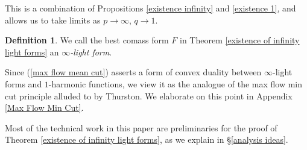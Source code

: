 \documentclass[reqno,11pt]{amsart}
\newcommand{\dfn}[1]{\emph{#1}\index{#1}}
\theoremstyle{definition}
\newtheorem{definition}[theorem]{Definition}
\numberwithin{equation}{section}
\begin{document}
This is a combination of Propositions \ref{existence infinity} and \ref{existence 1}, and allows us to take limits as $p \to \infty$, $q \to 1$.

\begin{definition}
We call the best comass form $F$ in Theorem \ref{existence of infinity light forms} an \dfn{$\infty$-light form}.
\end{definition}

Since (\ref{max flow mean cut}) asserts a form of convex duality between $\infty$-light forms and $1$-harmonic functions, we view it as the analogue of the max flow min cut principle alluded to by Thurston.
We elaborate on this point in Appendix \ref{Max Flow Min Cut}.

Most of the technical work in this paper are preliminaries for the proof of Theorem \ref{existence of infinity light forms}, as we explain in \S\ref{analysis ideas}.

\end{document}
